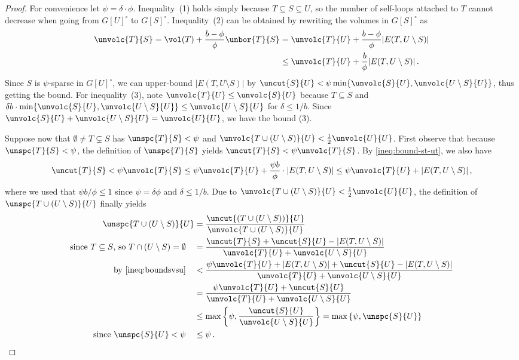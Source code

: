 \begin{proof}For convenience let $\psi= \delta \cdot \phi$. Inequality~(1) holds simply because $T \subseteq S \subseteq U$, so the number of self-loops attached to $T$ cannot decrease when going from $G[U]^\circ$ to $G[S]^\circ$. Inequality~(2) can be obtained by rewriting the volumes in $G[S]^\circ$ as
	\begin{align}
		\unvolc{T}{S} = \vol(T) + \frac{b-\phi}{\phi} \unbor{T}{S} & = \unvolc{T}{U} + \frac{b-\phi}{\phi} |E(T,U \setminus S)| \\
		& \leq \unvolc{T}{U} + \frac{b}{\phi} |E(T,U \setminus S)| \, .  \label{ineq:bound-st-ut}
	\end{align}
	Since $S$ is $\psi$-sparse in $G[U]^\circ$, we can upper-bound $|E(T,U \setminus S)|$ by $\uncut{S}{U} < \psi \min\{\unvolc{S}{U}, \unvolc{U \setminus S}{U}\}$, thus getting the bound. For inequality~(3), note $\unvolc{T}{U} \le \unvolc{S}{U}$ because $T \subseteq S$ and $\delta  b\cdot \min\{\unvolc{S}{U}, \unvolc{U \setminus S}{U}\} \le \unvolc{U \setminus S}{U}$ for $\delta \le 1/b$. Since $\unvolc{S}{U}+\unvolc{U \setminus S}{U}=\unvolc{U}{U}$, we have the bound (3).
	
	Suppose now that $\emptyset \neq T \subsetneq S$ has $\unspc{T}{S} < \psi$ and $\unvolc{T \cup (U \setminus S)}{U} < \frac{1}{2} \unvolc{U}{U}$. First observe that because $\unspc{T}{S} < \psi$, the definition of $\unspc{T}{S} $ yields $\uncut{T}{S} < \psi \unvolc{T}{S}$. By \cref{ineq:bound-st-ut}, we also have
	\begin{equation}
		\label{ineq:boundsvsu}
		\uncut{T}{S} < \psi \unvolc{T}{S} \leq \psi \unvolc{T}{U} + \frac{\psi b}{\phi} \cdot |E(T,U \setminus S)| \le \psi \unvolc{T}{U} +|E(T,U \setminus S)| \, ,
	\end{equation}
	where we used that $\psi  b / \phi  \le 1$ since $\psi = \delta\phi$ and $\delta \le 1/b$. Due to $\unvolc{T \cup (U \setminus S)}{U} < \frac{1}{2} \unvolc{U}{U}$, the definition of $\unspc{T \cup (U \setminus S)}{U}$ finally yields
	\begin{align*}
		\unspc{T \cup (U \setminus S)}{U} & = \frac{\uncut{(T \cup (U \setminus S))}{U}}{\unvolc{T \cup (U \setminus S)}{U}} \\
		\text{since $T \subseteq S$, so $T \cap (U \setminus S) = \emptyset$} \quad & = \frac{\uncut{T}{S} +\uncut{S}{U}-|E(T,U \setminus S)|}{\unvolc{T}{U}+\unvolc{U \setminus S}{U}} \\
		\text{by~\eqref{ineq:boundsvsu}} \quad& < \frac{\psi \unvolc{T}{U} + |E(T,U \setminus S)| +\uncut{S}{U}-|E(T,U \setminus S)|}{\unvolc{T}{U}+\unvolc{U \setminus S}{U}} \\
		& = \frac{\psi \unvolc{T}{U} +\uncut{S}{U}}{\unvolc{T}{U}+\unvolc{U \setminus S}{U}} \\
		& \le \max\left\{\psi, \frac{\uncut{S}{U}}{\unvolc{U \setminus S}{U}}\right\} = \max\left\{\psi, \unspc{S}{U}\right\} \\
		\text{since $\unspc{S}{U} <\psi$}\quad& \le \psi \, .
	\end{align*}
\end{proof}
